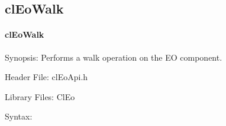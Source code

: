 \begin{flushleft}
\subsection{clEoWalk}
\hypertarget{pageeo103}{}\paragraph{cl\-Eo\-Walk}\label{pageeo103}
\begin{Desc}
\item[Synopsis:]Performs a walk operation on the EO component.\end{Desc}
\begin{Desc}
\item[Header File:]clEoApi.h\end{Desc}
\begin{Desc}
\item[Library Files:]Cl\-Eo\end{Desc}
\begin{Desc}
\item[Syntax:]


\end{Desc}
\end{flushleft}
